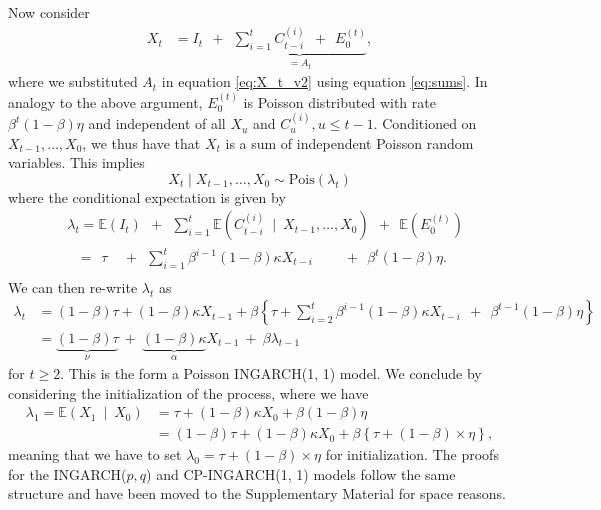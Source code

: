 \documentclass{article}
\begin{document}
Now consider %
\begin{align}
X_t & = I_t \ \ + \ \ \underbrace{\sum_{i = 1}^{t} C_{t - i}^{(i)} \ \ + \ \ E_0^{(t)}}_{= A_t}, \label{eq:decomposition_Xt}
\end{align}
where we substituted $A_t$ in equation \eqref{eq:X_t_v2} using equation \eqref{eq:sums}. In analogy to the above argument, $E_0^{(t)}$ is Poisson distributed with rate $\beta^{t}(1 - \beta)\eta$ and independent of all $X_u$ and $C_u^{(i)}, u \leq t - 1$. Conditioned on $X_{t - 1}, \dots, X_0$, we thus have that $X_t$ is a sum of independent Poisson random variables. This implies
$$
X_t \mid X_{t - 1}, \dots, X_0 \sim \text{Pois}(\lambda_t)
$$
where the conditional expectation is given by
\begin{align*}
& \lambda_t = \mathbb{E}(I_t) \ \ + \ \ \sum_{i = 1}^t \mathbb{E}(C_{t - i}^{(i)} \ \mid \ X_{t- 1}, \dots, X_0) \ \ + \ \ \mathbb{E}(E_0^{(t)})\\
& \ \ \ = \ \ \tau \ \ \ \ \ + \ \ \sum_{i = 1}^t \beta^{i - 1}(1 - \beta)\kappa X_{t - i} \ \ \ \ \ \ \ \ \ \ + \ \ \beta^{t}(1 - \beta)\eta.\\
\end{align*}
We can then re-write $\lambda_t$ as
\begin{align*}
\lambda_t & = (1 - \beta)\tau + (1 - \beta)\kappa X_{t - 1} + \beta \left\{\tau +    \sum_{i = 2}^t \beta^{i - 1}(1 - \beta)\kappa X_{t - i}  \ \ + \ \ \beta^{t - 1}(1 - \beta)\eta\right\}\\
& = \underbrace{(1 - \beta)\tau}_{\nu} \ + \ \underbrace{(1 - \beta)\kappa}_{\alpha} X_{t - 1} \ + \ \beta \lambda_{t - 1}
\end{align*}
for $t \geq 2$. This is the form a Poisson INGARCH(1, 1) model. We conclude by considering the initialization of the process, where we have
\begin{align*}
\lambda_1 = \mathbb{E}(X_1 \ \mid \ X_0) & = \tau + (1 - \beta)\kappa X_0 + \beta(1 - \beta)\eta\\
& =  (1 - \beta)\tau + (1 - \beta)\kappa X_0 + \beta  \left\{\tau + (1 - \beta) \times \eta \right\},
\end{align*}
meaning that we have to set $\lambda_0 =\tau + (1 - \beta) \times \eta$ for initialization. The proofs for the INGARCH($p, q$) and CP-INGARCH(1, 1) models follow the same structure and have been moved to the Supplementary Material for space reasons. 
\end{document}
